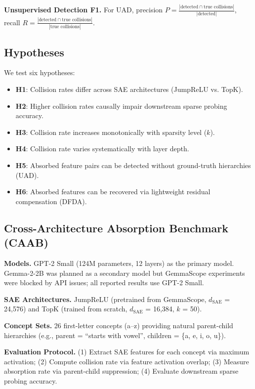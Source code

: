 \documentclass{article}
\begin{document}
\textbf{Unsupervised Detection F1.} For UAD, precision $P = \frac{|\text{detected} \cap \text{true collisions}|}{|\text{detected}|}$, recall $R = \frac{|\text{detected} \cap \text{true collisions}|}{|\text{true collisions}|}$.

\subsection{Hypotheses}\label{sec:hypotheses}

We test six hypotheses:
\begin{itemize}
    \item \textbf{H1}: Collision rates differ across SAE architectures (JumpReLU vs. TopK).
    \item \textbf{H2}: Higher collision rates causally impair downstream sparse probing accuracy.
    \item \textbf{H3}: Collision rate increases monotonically with sparsity level ($k$).
    \item \textbf{H4}: Collision rate varies systematically with layer depth.
    \item \textbf{H5}: Absorbed feature pairs can be detected without ground-truth hierarchies (UAD).
    \item \textbf{H6}: Absorbed features can be recovered via lightweight residual compensation (DFDA).
\end{itemize}

\subsection{Cross-Architecture Absorption Benchmark (CAAB)}

\textbf{Models.} GPT-2 Small (124M parameters, 12 layers) as the primary model. Gemma-2-2B was planned as a secondary model but GemmaScope experiments were blocked by API issues; all reported results use GPT-2 Small.

\textbf{SAE Architectures.} JumpReLU (pretrained from GemmaScope, $d_{\text{SAE}}$ = 24,576) and TopK (trained from scratch, $d_{\text{SAE}}$ = 16,384, $k$ = 50).

\textbf{Concept Sets.} 26 first-letter concepts (a--z) providing natural parent-child hierarchies (e.g., parent = ``starts with vowel'', children = \{a, e, i, o, u\}).

\textbf{Evaluation Protocol.} (1) Extract SAE features for each concept via maximum activation; (2) Compute collision rate via feature activation overlap; (3) Measure absorption rate via parent-child suppression; (4) Evaluate downstream sparse probing accuracy.
\end{document}
